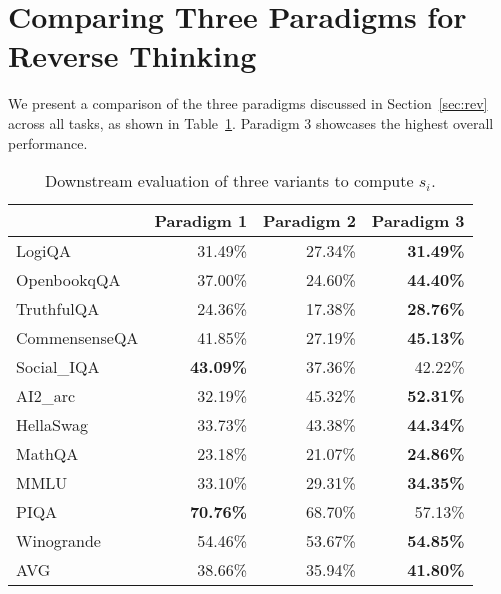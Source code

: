 \section{Comparing Three Paradigms for Reverse Thinking}
\label{app:rev_comparison}
We present a comparison of the three paradigms discussed in Section~\ref{sec:rev} across all tasks, as shown in Table~\ref{tab:3variants}. Paradigm 3 showcases the highest overall performance.


\begin{table}[!htp]\centering
{}
    \caption{Downstream evaluation of three variants to compute $s_i$. }\label{tab:3variants}
    \small
    \begin{tabular}{lrrr}\toprule
    &Paradigm 1 &Paradigm 2 &Paradigm 3 \\\midrule
    LogiQA &31.49\% &27.34\% &\textbf{31.49\%} \\
    OpenbookqQA &37.00\% &24.60\% &\textbf{44.40\%} \\
    TruthfulQA &24.36\% &17.38\% &\textbf{28.76\%} \\
    CommensenseQA &41.85\% &27.19\% &\textbf{45.13\%} \\
    Social\_IQA &\textbf{43.09\%} &37.36\% &42.22\% \\
    AI2\_arc &32.19\% &45.32\% &\textbf{52.31\%} \\
    HellaSwag &33.73\% &43.38\% &\textbf{44.34\%} \\
    MathQA &23.18\% &21.07\% &\textbf{24.86\%} \\
    MMLU & 33.10\% &29.31\% &\textbf{34.35\%} \\
    PIQA &\textbf{70.76\%} &68.70\% &57.13\% \\
    Winogrande & 54.46\% &53.67\% &\textbf{54.85\%} \\
    AVG &38.66\% &35.94\% &\textbf{41.80\%} \\
    \bottomrule
    \end{tabular}
    \end{table}


